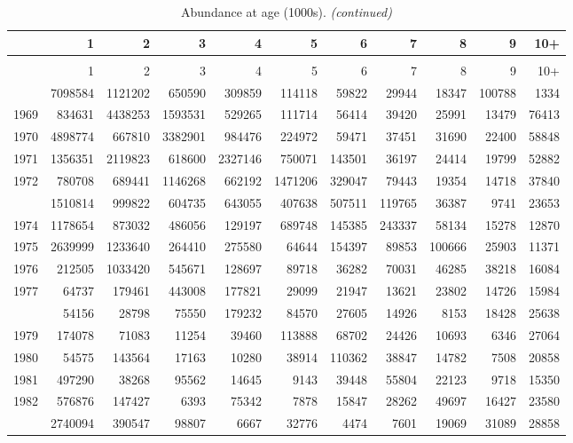 \documentclass[
]{article}
\begin{document}
\begin{longtable}[t]{lrrrrrrrrrr}
\caption{\label{tab:NAA-table}Abundance at age (1000s).}\\
\toprule
  & 1 & 2 & 3 & 4 & 5 & 6 & 7 & 8 & 9 & 10+\\
\midrule
\endfirsthead
\caption[]{Abundance at age (1000s). \textit{(continued)}}\\
\toprule
  & 1 & 2 & 3 & 4 & 5 & 6 & 7 & 8 & 9 & 10+\\
\midrule
\endhead

\endfoot
\bottomrule
\endlastfoot
1968 & 7098584 & 1121202 & 650590 & 309859 & 114118 & 59822 & 29944 & 18347 & 100788 & 1334\\
1969 & 834631 & 4438253 & 1593531 & 529265 & 111714 & 56414 & 39420 & 25991 & 13479 & 76413\\
1970 & 4898774 & 667810 & 3382901 & 984476 & 224972 & 59471 & 37451 & 31690 & 22400 & 58848\\
1971 & 1356351 & 2119823 & 618600 & 2327146 & 750071 & 143501 & 36197 & 24414 & 19799 & 52882\\
1972 & 780708 & 689441 & 1146268 & 662192 & 1471206 & 329047 & 79443 & 19354 & 14718 & 37840\\
\addlinespace
1973 & 1510814 & 999822 & 604735 & 643055 & 407638 & 507511 & 119765 & 36387 & 9741 & 23653\\
1974 & 1178654 & 873032 & 486056 & 129197 & 689748 & 145385 & 243337 & 58134 & 15278 & 12870\\
1975 & 2639999 & 1233640 & 264410 & 275580 & 64644 & 154397 & 89853 & 100666 & 25903 & 11371\\
1976 & 212505 & 1033420 & 545671 & 128697 & 89718 & 36282 & 70031 & 46285 & 38218 & 16084\\
1977 & 64737 & 179461 & 443008 & 177821 & 29099 & 21947 & 13621 & 23802 & 14726 & 15984\\
\addlinespace
1978 & 54156 & 28798 & 75550 & 179232 & 84570 & 27605 & 14926 & 8153 & 18428 & 25638\\
1979 & 174078 & 71083 & 11254 & 39460 & 113888 & 68702 & 24426 & 10693 & 6346 & 27064\\
1980 & 54575 & 143564 & 17163 & 10280 & 38914 & 110362 & 38847 & 14782 & 7508 & 20858\\
1981 & 497290 & 38268 & 95562 & 14645 & 9143 & 39448 & 55804 & 22123 & 9718 & 15350\\
1982 & 576876 & 147427 & 6393 & 75342 & 7878 & 15847 & 28262 & 49697 & 16427 & 23580\\
\addlinespace
1983 & 2740094 & 390547 & 98807 & 6667 & 32776 & 4474 & 7601 & 19069 & 31089 & 28858\\

\end{longtable}
\end{document}

